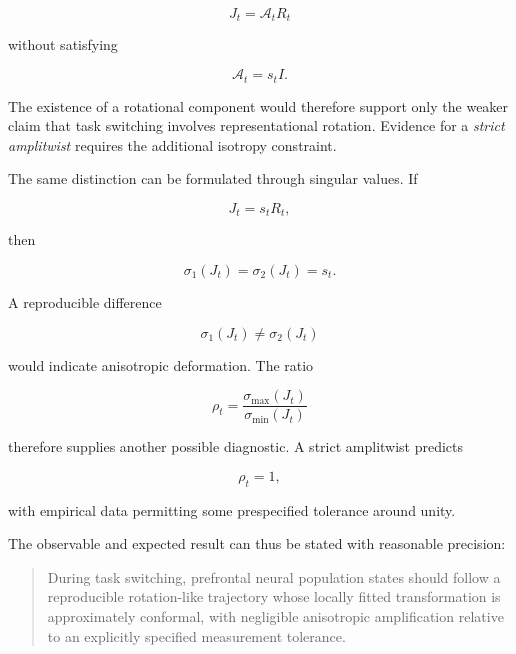 \documentclass[11pt]{article}
\begin{document}
\begin{equation}
J_t=\mathcal A_tR_t
\end{equation}

without satisfying

\begin{equation}
\mathcal A_t=s_tI.
\end{equation}

The existence of a rotational component would therefore support only the weaker claim that task switching involves representational rotation. Evidence for a \emph{strict amplitwist} requires the additional isotropy constraint.

The same distinction can be formulated through singular values. If

\begin{equation}
J_t=s_tR_t,
\end{equation}

then

\begin{equation}
\sigma_1(J_t)=\sigma_2(J_t)=s_t.
\end{equation}

A reproducible difference

\begin{equation}
\sigma_1(J_t)\neq\sigma_2(J_t)
\end{equation}

would indicate anisotropic deformation. The ratio

\begin{equation}
\rho_t
=
\frac{\sigma_{\max}(J_t)}
{\sigma_{\min}(J_t)}
\end{equation}

therefore supplies another possible diagnostic. A strict amplitwist predicts

\begin{equation}
\rho_t=1,
\end{equation}

with empirical data permitting some prespecified tolerance around unity.

The observable and expected result can thus be stated with reasonable precision:

\begin{quote}
During task switching, prefrontal neural population states should follow a reproducible rotation-like trajectory whose locally fitted transformation is approximately conformal, with negligible anisotropic amplification relative to an explicitly specified measurement tolerance.
\end{quote}
\end{document}
